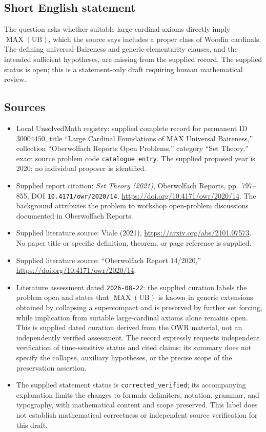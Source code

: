 \documentclass[11pt]{article}
\begin{document}
\subsection{Short English statement}
The question asks whether suitable large-cardinal axioms directly imply \(\operatorname{MAX}(\mathrm{UB})\), which the source says includes a proper class of Woodin cardinals. The defining universal-Baireness and generic-elementarity clauses, and the intended sufficient hypotheses, are missing from the supplied record. The supplied status is open; this is a statement-only draft requiring human mathematical review.
\subsection{Sources}
\begin{itemize}
\item Local UnsolvedMath registry: supplied complete record for permanent ID \(30004450\), title ``Large Cardinal Foundations of MAX Universal Baireness,'' collection ``Oberwolfach Reports Open Problems,'' category ``Set Theory,'' exact source problem code \texttt{catalogue entry}. The supplied proposed year is 2020; no individual proposer is identified.
\item Supplied report citation: \emph{Set Theory (2021)}, Oberwolfach Reports, pp.~797--855, DOI \texttt{10.4171/owr/2020/14}. \url{https://doi.org/10.4171/owr/2020/14}. The background attributes the problem to workshop open-problem discussions documented in Oberwolfach Reports.
\item Supplied literature source: Viale (2021), \url{https://arxiv.org/abs/2101.07573}. No paper title or specific definition, theorem, or page reference is supplied.
\item Supplied literature source: ``Oberwolfach Report 14/2020,'' \url{https://doi.org/10.4171/owr/2020/14}.
\item Literature assessment dated \texttt{2026-08-22}: the supplied curation labels the problem open and states that \(\operatorname{MAX}(\mathrm{UB})\) is known in generic extensions obtained by collapsing a supercompact and is preserved by further set forcing, while implication from suitable large-cardinal axioms alone remains open. This is supplied dated curation derived from the OWR material, not an independently verified assessment. The record expressly requests independent verification of time-sensitive status and cited claims; its summary does not specify the collapse, auxiliary hypotheses, or the precise scope of the preservation assertion.
\item The supplied statement status is \texttt{corrected\_verified}; its accompanying explanation limits the changes to formula delimiters, notation, grammar, and typography, with mathematical content and scope preserved. This label does not establish mathematical correctness or independent source verification for this draft.
\end{itemize}
\end{document}
